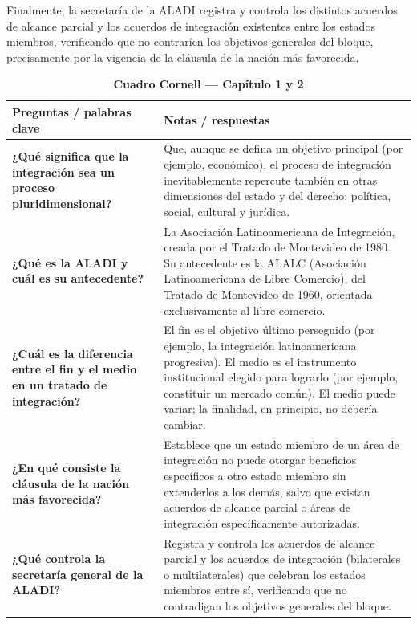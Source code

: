 \documentclass[12pt,oneside]{book}
\begin{document}
Finalmente, la secretaría de la ALADI registra y controla los distintos acuerdos de alcance parcial y los acuerdos de integración existentes entre los estados miembros, verificando que no contraríen los objetivos generales del bloque, precisamente por la vigencia de la cláusula de la nación más favorecida.

\begin{table}[H]
\centering
\caption*{\textbf{Cuadro Cornell --- Capítulo 1 y 2}}
\begin{tabularx}{\textwidth}{
    >{\raggedright\arraybackslash}p{}
    >{\raggedright\arraybackslash}X
}
\toprule
\textbf{Preguntas / palabras clave} &
\textbf{Notas / respuestas} \\
\midrule

\textbf{¿Qué significa que la integración sea un proceso pluridimensional?} &
Que, aunque se defina un objetivo principal (por ejemplo, económico), el proceso de integración inevitablemente repercute también en otras dimensiones del estado y del derecho: política, social, cultural y jurídica. \\

\textbf{¿Qué es la ALADI y cuál es su antecedente?} &
La Asociación Latinoamericana de Integración, creada por el Tratado de Montevideo de 1980. Su antecedente es la ALALC (Asociación Latinoamericana de Libre Comercio), del Tratado de Montevideo de 1960, orientada exclusivamente al libre comercio. \\

\textbf{¿Cuál es la diferencia entre el fin y el medio en un tratado de integración?} &
El fin es el objetivo último perseguido (por ejemplo, la integración latinoamericana progresiva). El medio es el instrumento institucional elegido para lograrlo (por ejemplo, constituir un mercado común). El medio puede variar; la finalidad, en principio, no debería cambiar. \\

\textbf{¿En qué consiste la cláusula de la nación más favorecida?} &
Establece que un estado miembro de un área de integración no puede otorgar beneficios específicos a otro estado miembro sin extenderlos a los demás, salvo que existan acuerdos de alcance parcial o áreas de integración específicamente autorizadas. \\

\textbf{¿Qué controla la secretaría general de la ALADI?} &
Registra y controla los acuerdos de alcance parcial y los acuerdos de integración (bilaterales o multilaterales) que celebran los estados miembros entre sí, verificando que no contradigan los objetivos generales del bloque. \\


\end{tabularx}
\end{table}
\end{document}
